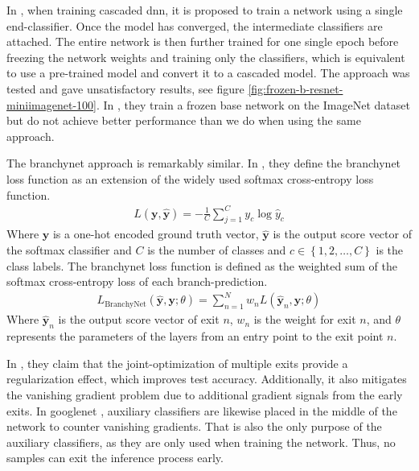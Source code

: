 In \cite{leroux_resource-constrained_2015}, when training cascaded \gls{dnn}, it is proposed to train a network using a single end-classifier. Once the model has converged, the intermediate classifiers are attached. The entire network is then further trained for one single epoch before freezing the network weights and training only the classifiers, which is equivalent to use a pre-trained model and convert it to a cascaded model. The approach was tested and gave unsatisfactory results, see figure \ref{fig:frozen-b-resnet-miniimagenet-100}. In \cite{leroux_cascading_2017}, they train a frozen base network on the ImageNet dataset but do not achieve better performance than we do when using the same approach.  

The \gls{branchynet} approach is remarkably similar. In \cite{teerapittayanon_branchynet:_2016}, they define the \gls{branchynet} loss function as an extension of the widely used softmax cross-entropy loss function.
\begin{align}
L\left(\bm{y},\hat{\bm{y}}\right) = - \frac{1}{C} \sum_{j =1}^{C} y_c \log \hat{y}_c
\end{align}
Where $ \bm{y} $ is a one-hot encoded ground truth vector, $ \bm{\hat{y}} $ is the output score vector of the softmax classifier and $ C $ is the number of classes and $ c \in \left\{1, 2,  \dots, C\right\} $ is the class labels.
The \gls{branchynet} loss function is defined as the weighted sum of the softmax cross-entropy loss of each branch-prediction. 
\begin{align}
L_{\mathrm{BranchyNet}}(\hat{\bm{y}},\bm{y};\theta) = \sum_{n=1}^{N} w_n L \left(\hat{\bm{y}}_{n},\bm{y};\theta\right)
\end{align}
Where $ \bm{\hat{y}}_n $ is the output score vector of exit $ n $, $ w_n $ is the weight for exit $ n $, and $ \theta $ represents the parameters of the layers from an entry point to the exit point $ n $.

In \cite{teerapittayanon_branchynet:_2016}, they claim that the joint-optimization of multiple exits provide a regularization effect, which improves test accuracy. Additionally, it also mitigates the vanishing gradient problem due to additional gradient signals from the early exits.  In \gls{googlenet} \cite{szegedy_going_2015}, auxiliary classifiers are likewise placed in the middle of the network to counter vanishing gradients. That is also the only purpose of the auxiliary classifiers, as they are only used when training the network. Thus, no samples can exit the inference process early. 

